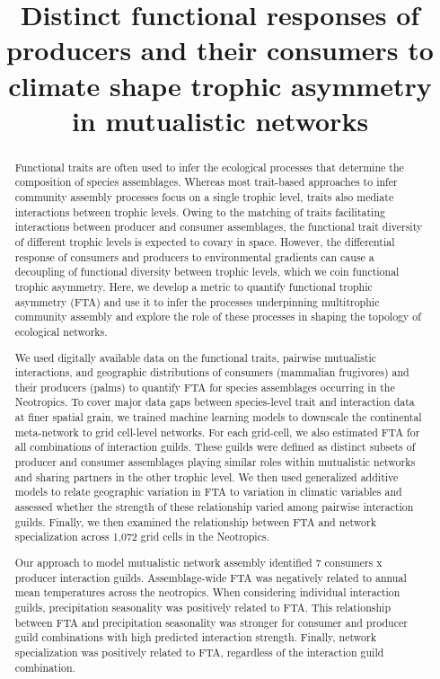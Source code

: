 \documentclass[
]{agujournal2019}
\begin{document}
\title{Distinct functional responses of producers and their consumers to
climate shape trophic asymmetry in mutualistic networks}



\begin{abstract}
Functional traits are often used to infer the ecological processes that
determine the composition of species assemblages. Whereas most
trait-based approaches to infer community assembly processes focus on a
single trophic level, traits also mediate interactions between trophic
levels. Owing to the matching of traits facilitating interactions
between producer and consumer assemblages, the functional trait
diversity of different trophic levels is expected to covary in space.
However, the differential response of consumers and producers to
environmental gradients can cause a decoupling of functional diversity
between trophic levels, which we coin functional trophic asymmetry.
Here, we develop a metric to quantify functional trophic asymmetry (FTA)
and use it to infer the processes underpinning multitrophic community
assembly and explore the role of these processes in shaping the topology
of ecological networks.

We used digitally available data on the functional traits, pairwise
mutualistic interactions, and geographic distributions of consumers
(mammalian frugivores) and their producers (palms) to quantify FTA for
species assemblages occurring in the Neotropics. To cover major data
gaps between species-level trait and interaction data at finer spatial
grain, we trained machine learning models to downscale the continental
meta-network to grid cell-level networks. For each grid-cell, we also
estimated FTA for all combinations of interaction guilds. These guilds
were defined as distinct subsets of producer and consumer assemblages
playing similar roles within mutualistic networks and sharing partners
in the other trophic level. We then used generalized additive models to
relate geographic variation in FTA to variation in climatic variables
and assessed whether the strength of these relationship varied among
pairwise interaction guilds. Finally, we then examined the relationship
between FTA and network specialization across 1,072 grid cells in the
Neotropics.

Our approach to model mutualistic network assembly identified 7
consumers x producer interaction guilds. Assemblage-wide FTA was
negatively related to annual mean temperatures across the neotropics.
When considering individual interaction guilds, precipitation
seasonality was positively related to FTA. This relationship between FTA
and precipitation seasonality was stronger for consumer and producer
guild combinations with high predicted interaction strength. Finally,
network specialization was positively related to FTA, regardless of the
interaction guild combination.


\end{abstract}
\end{document}
